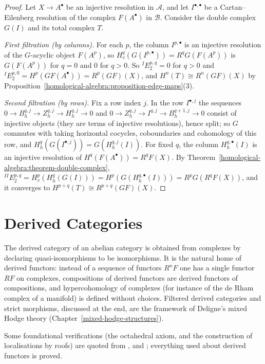 \begin{proof}
Let $X \to A^\bullet$ be an injective resolution in $\mathcal{A}$, and let $I^{\bullet,\bullet}$ be a Cartan--Eilenberg resolution of the complex $F(A^\bullet)$ in
$\mathcal{B}$. Consider the double complex $G(I)$ and its total complex $T$.

\emph{First filtration (by columns).} For each $p$, the column $I^{p,\bullet}$ is an injective resolution of the $G$-acyclic object $F(A^p)$, so
$H^q_v(G(I^{p,\bullet})) = R^qG(F(A^p))$ is $G(F(A^p))$ for $q = 0$ and $0$ for $q > 0$. So ${}^IE_2^{p,q} = 0$ for $q > 0$ and
${}^IE_2^{p,0} = H^p(GF(A^\bullet)) = R^p(GF)(X)$, and $H^n(T) \cong R^n(GF)(X)$ by Proposition~\ref{homological-algebra:proposition-edge-maps}(3).

\emph{Second filtration (by rows).} Fix a row index $j$. In the row $I^{\bullet,j}$ the sequences
$0 \to B^{q,j}_h \to Z^{q,j}_h \to H^{q,j}_h \to 0$ and $0 \to Z^{q,j}_h \to I^{q,j} \to B^{q+1,j}_h \to 0$ consist of injective objects (they are terms of
injective resolutions), hence split; so $G$ commutes with taking horizontal cocycles, coboundaries and cohomology of this row, and
$H^q_h(G(I^{\bullet,j})) = G(H^{q,j}_h(I))$. For fixed $q$, the column $H^{q,\bullet}_h(I)$ is an injective resolution of
$H^q(F(A^\bullet)) = R^qF(X)$. By Theorem~\ref{homological-algebra:theorem-double-complex},
${}^{II}E_2^{p,q} = H^p_v(H^q_h(G(I))) = H^p(G(H^{q,\bullet}_h(I))) = R^pG(R^qF(X))$, and it converges to
$H^{p+q}(T) \cong R^{p+q}(GF)(X)$.
\end{proof}

\section{Derived Categories}\label{homological-algebra:section-derived-categories}
The derived category of an abelian category is obtained from complexes by declaring quasi-isomorphisms to be
isomorphisms. It is the natural home of derived functors: instead of a sequence of functors $R^nF$ one has a
single functor $RF$ on complexes, compositions of derived functors are derived functors of compositions, and
hypercohomology of complexes (for instance of the de Rham complex of a manifold) is defined without choices.
Filtered derived categories and strict morphisms, discussed at the end, are the framework of Deligne's mixed Hodge
theory (Chapter~\ref{mixed-hodge-structures}).

Some foundational verifications (the octahedral axiom, and the construction of localisations by roofs) are quoted
from \cite[Chapter 10]{weibel-homological}, \cite[Chapter III]{gelfand-manin} and \cite{kashiwara-schapira}; everything
used about derived functors is proved.

